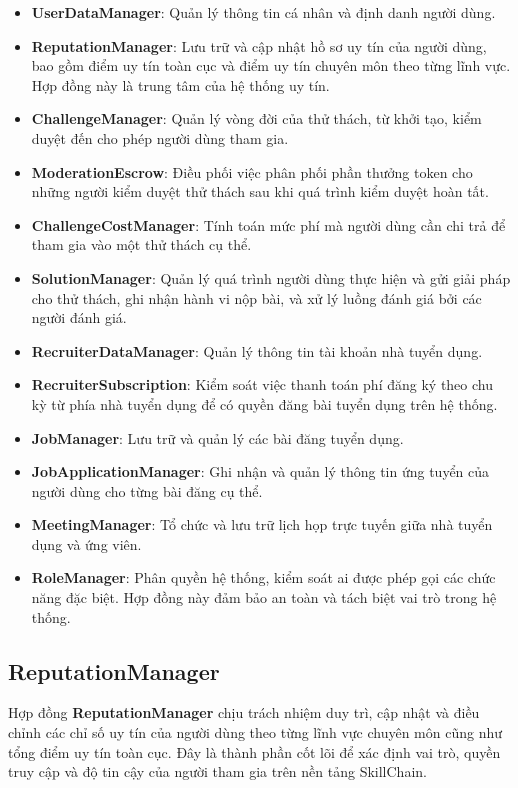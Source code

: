 \begin{itemize}
  \item \textbf{UserDataManager}: Quản lý thông tin cá nhân và định danh người dùng.
  \item \textbf{ReputationManager}: Lưu trữ và cập nhật hồ sơ uy tín của người dùng, bao gồm điểm uy tín toàn cục và điểm uy tín chuyên môn theo từng lĩnh vực. Hợp đồng này là trung tâm của hệ thống uy tín.
  \item \textbf{ChallengeManager}: Quản lý vòng đời của thử thách, từ khởi tạo, kiểm duyệt đến cho phép người dùng tham gia.
  \item \textbf{ModerationEscrow}: Điều phối việc phân phối phần thưởng token cho những người kiểm duyệt thử thách sau khi quá trình kiểm duyệt hoàn tất.
  \item \textbf{ChallengeCostManager}: Tính toán mức phí mà người dùng cần chi trả để tham gia vào một thử thách cụ thể.
  \item \textbf{SolutionManager}: Quản lý quá trình người dùng thực hiện và gửi giải pháp cho thử thách, ghi nhận hành vi nộp bài, và xử lý luồng đánh giá bởi các người đánh giá.
  \item \textbf{RecruiterDataManager}: Quản lý thông tin tài khoản nhà tuyển dụng.
  \item \textbf{RecruiterSubscription}: Kiểm soát việc thanh toán phí đăng ký theo chu kỳ từ phía nhà tuyển dụng để có quyền đăng bài tuyển dụng trên hệ thống.
  \item \textbf{JobManager}: Lưu trữ và quản lý các bài đăng tuyển dụng.
  \item \textbf{JobApplicationManager}: Ghi nhận và quản lý thông tin ứng tuyển của người dùng cho từng bài đăng cụ thể.
  \item \textbf{MeetingManager}: Tổ chức và lưu trữ lịch họp trực tuyến giữa nhà tuyển dụng và ứng viên.
  \item \textbf{RoleManager}: Phân quyền hệ thống, kiểm soát ai được phép gọi các chức năng đặc biệt. Hợp đồng này đảm bảo an toàn và tách biệt vai trò trong hệ thống.
\end{itemize}

\subsection{ReputationManager}

Hợp đồng \textbf{ReputationManager} chịu trách nhiệm duy trì, cập nhật và điều chỉnh các chỉ số uy tín của người dùng theo từng lĩnh vực chuyên môn cũng như tổng điểm uy tín toàn cục.
Đây là thành phần cốt lõi để xác định vai trò, quyền truy cập và độ tin cậy của người tham gia trên nền tảng SkillChain.

